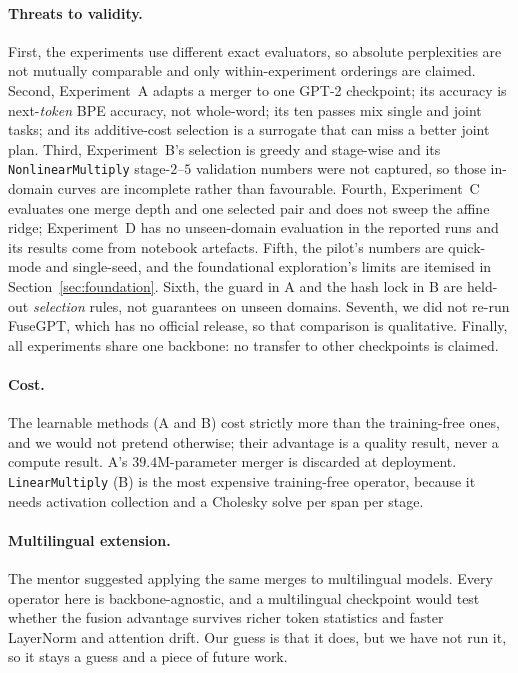 \documentclass[10pt,a4paper]{article}
\newcommand{\linop}{\texttt{LinearMultiply}}
\newcommand{\nlop}{\texttt{NonlinearMultiply}}
\begin{document}
\paragraph{Threats to validity.} First, the experiments use different exact
evaluators, so absolute perplexities are not mutually comparable and only
within-experiment orderings are claimed. Second, Experiment~A adapts a merger to
one GPT-2 checkpoint; its accuracy is next-\emph{token} BPE accuracy, not
whole-word; its ten passes mix single and joint tasks; and its additive-cost
selection is a surrogate that can miss a better joint plan. Third, Experiment~B's
selection is greedy and stage-wise and its \nlop{} stage-$2$--$5$ validation
numbers were not captured, so those in-domain curves are incomplete rather than
favourable. Fourth, Experiment~C evaluates one merge depth and one selected pair
and does not sweep the affine ridge; Experiment~D has no unseen-domain
evaluation in the reported runs and its results come from notebook artefacts.
Fifth, the pilot's numbers are quick-mode and single-seed, and the foundational
exploration's limits are itemised in Section~\ref{sec:foundation}. Sixth, the
guard in A and the hash lock in B are held-out \emph{selection} rules, not
guarantees on unseen domains. Seventh, we did not re-run FuseGPT, which has no
official release, so that comparison is qualitative. Finally, all experiments
share one backbone: no transfer to other checkpoints is claimed.

\paragraph{Cost.} The learnable methods (A and B) cost strictly more than the
training-free ones, and we would not pretend otherwise; their advantage is a
quality result, never a compute result. A's $39.4$M-parameter merger is
discarded at deployment. \linop{} (B) is the most expensive training-free
operator, because it needs activation collection and a Cholesky solve per span
per stage.

\paragraph{Multilingual extension.} The mentor suggested applying the same
merges to multilingual models. Every operator here is backbone-agnostic, and a
multilingual checkpoint would test whether the fusion advantage survives
richer token statistics and faster LayerNorm and attention drift. Our guess is
that it does, but we have not run it, so it stays a guess and a piece of future
work.
\end{document}

